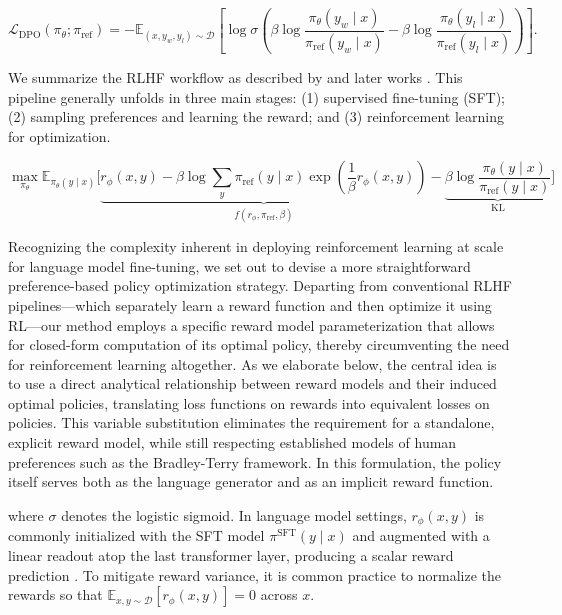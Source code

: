 \begin{equation}\label{eq:optimum_model}
    \mathcal{L}_\text{DPO}(\pi_{\theta}; \pi_\text{ref}) = -\mathbb{E}_{(x, y_w, y_l)\sim \mathcal{D}}\left[\log \sigma \left(\beta \log \frac{\pi_{\theta}(y_w\mid x)}{\pi_\text{ref}(y_w\mid x)} - \beta \log \frac{\pi_{\theta}(y_l\mid x)}{\pi_\text{ref}(y_l\mid x)}\right)\right].
\end{equation}

We summarize the RLHF workflow as described by \citeauthor{ziegler2020finetuning} and later works \citep{stiennon2022learning, bai2022training, ouyang2022training}. This pipeline generally unfolds in three main stages: (1) supervised fine-tuning (SFT); (2) sampling preferences and learning the reward; and (3) reinforcement learning for optimization.

\begin{equation}\label{eq:AC}
    \max_{\pi_{\theta}}\mathbb{E}_{\pi_{\theta}(y\mid x)}\bigg[\underbrace{r_{\phi}(x, y) -\beta\log\sum_{y}\pi_\text{ref}(y\mid x)\exp\left(\frac{1}{\beta}r_{\phi}(x, y)\right)}_{f(r_{\phi}, \pi_\text{ref}, \beta)} - \underbrace{\beta\log\frac{\pi_{\theta}(y\mid x)}{\pi_\text{ref}(y\mid x)}}_{\text{KL}}\bigg]
\end{equation}

Recognizing the complexity inherent in deploying reinforcement learning at scale for language model fine-tuning, we set out to devise a more straightforward preference-based policy optimization strategy. Departing from conventional RLHF pipelines—which separately learn a reward function and then optimize it using RL—our method employs a specific reward model parameterization that allows for closed-form computation of its optimal policy, thereby circumventing the need for reinforcement learning altogether. As we elaborate below, the central idea is to use a direct analytical relationship between reward models and their induced optimal policies, translating loss functions on rewards into equivalent losses on policies. This variable substitution eliminates the requirement for a standalone, explicit reward model, while still respecting established models of human preferences such as the Bradley-Terry framework. In this formulation, the policy itself serves both as the language generator and as an implicit reward function.

where $\sigma$ denotes the logistic sigmoid. In language model settings, $r_{\phi}(x, y)$ is commonly initialized with the SFT model $\pi^\text{SFT}(y \mid x)$ and augmented with a linear readout atop the last transformer layer, producing a scalar reward prediction \cite{ziegler2020finetuning}. To mitigate reward variance, it is common practice to normalize the rewards so that $\mathbb{E}_{x,y\sim \mathcal{D}}\left[r_\phi(x, y)\right] = 0$ across $x$.

